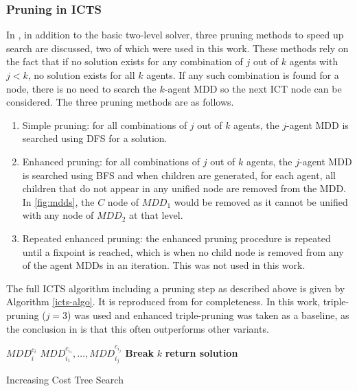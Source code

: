 \documentclass[english]{article}
\begin{document}
	\subsubsection{Pruning in ICTS}
	\label{pruning}
	In \cite{sharon2011}, in addition to the basic two-level solver, three pruning methods to speed up search are discussed, two of which were used in this work. These methods rely on the fact that if no solution exists for any combination of $j$ out of $k$ agents with $j < k$, no solution exists for all $k$ agents. If any such combination is found for a node, there is no need to search the $k$-agent MDD so the next ICT node can be considered. The three pruning methods are as follows.
	\begin{enumerate}
		\item Simple pruning: for all combinations of $j$ out of $k$ agents, the $j$-agent MDD is searched using DFS for a solution.
		\item Enhanced pruning: for all combinations of $j$ out of $k$ agents, the $j$-agent MDD is searched using BFS and when children are generated, for each agent, all children that do not appear in any unified node are removed from the MDD. In \ref{fig:mdds}, the $C$ node of $MDD_1$ would be removed as it cannot be unified with any node of $MDD_2$ at that level.
		\item Repeated enhanced pruning: the enhanced pruning procedure is repeated until a fixpoint is reached, which is when no child node is removed from any of the agent MDDs in an iteration. This was not used in this work. 
	\end{enumerate}
	The full ICTS algorithm including a pruning step as described above is given by Algorithm \ref{icts-algo}. It is reproduced from \cite{sharon2011} for completeness. In this work, triple-pruning ($j=3$) was used and enhanced triple-pruning was taken as a baseline, as the conclusion in \cite{sharon2011} is that this often outperforms other variants.
	\begin{algorithm}
		\begin{algorithmic}[1]
			\State {}
			 $MDD_i^{c_i}$
			\EndFor
			\State {}$MDD_{i_1}^{c_{i_1}},\ldots,MDD_{i_j}^{c_{i_j}}$
			\State \textbf{Break}
			\EndIf
			\EndFor
			\State {}$k$
			\State \textbf{return solution}
			\EndIf
			\EndFor
			
			\EndProcedure
		\end{algorithmic}
		\caption{Increasing Cost Tree Search}
		\label{icts-algo}
	\end{algorithm}
\end{document}
